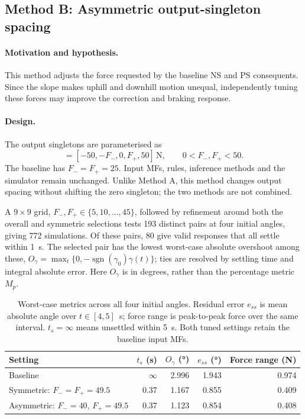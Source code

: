 \documentclass[11pt,a4paper]{article}
\newcommand{\gam}{\ensuremath{\gamma}}
\newcommand{\ts}{\ensuremath{t_s}}
\newcommand{\overshoot}{\ensuremath{M_p}}
\newcommand{\sse}{\ensuremath{e_{ss}}}
\begin{document}
\subsection{Method B: Asymmetric output-singleton spacing}
\label{sec:method-b}

\paragraph{Motivation and hypothesis.}
This method adjusts the force requested by the baseline NS and PS
consequents. Since the slope makes
uphill and downhill motion unequal, independently tuning these forces may
improve the correction and braking response.

\paragraph{Design.}
The output singletons are parameterised as
\begin{equation}
 [F_{\mathrm{NB}},F_{\mathrm{NS}},F_{\mathrm{ZO}},F_{\mathrm{PS}},F_{\mathrm{PB}}]
 =[-50,-F_-,0,F_+,50]\,\si{\N},\qquad 0<F_-,F_+<50.
 \label{eq:method-b-spacing}
\end{equation}
The baseline has $F_-=F_+=25$. Input MFs, rules, inference methods and the
simulator remain unchanged. Unlike Method A, this method changes output
spacing without shifting the zero singleton; the two methods are not combined.

A $9\times9$ grid, $F_-,F_+\in\{5,10,\ldots,45\}$, followed by refinement
around both the overall and symmetric selections tests 193 distinct pairs
at four initial angles, giving 772 simulations. Of these pairs, 80 give
valid responses that all settle within \SI{1}{\s}. The selected pair has
the lowest worst-case absolute overshoot among these,
$O_\gamma=\max_t\{0,-\operatorname{sgn}(\gam_0)\gam(t)\}$;
ties are resolved by settling time and integral absolute error.
Here $O_\gamma$ is in degrees, rather than the percentage metric $\overshoot$.

\begin{table}[H]
\centering
\small
\begin{tabular}{@{}lrrrr@{}}
\toprule
Setting & $\ts$ (\si{\s}) & $O_\gamma$ (\si{\degree}) & $\sse$ (\si{\degree}) & Force range (\si{\N}) \\
\midrule
Baseline & $\infty$ & 2.996 & 1.943 & 0.974 \\
Symmetric: $F_-=F_+=49.5$ & 0.37 & 1.167 & 0.855 & 0.409 \\
Asymmetric: $F_-=40$, $F_+=49.5$ & 0.37 & 1.123 & 0.854 & 0.408 \\
\bottomrule
\end{tabular}
\caption{Worst-case metrics across all four initial angles. Residual error
$\sse$ is mean absolute angle over $t\in[4,5]$~\si{\s}; force range is
peak-to-peak force over the same interval. $\ts=\infty$ means unsettled
within \SI{5}{\s}. Both tuned settings retain the baseline input MFs.}
\label{tab:method-b}
\end{table}
\end{document}
